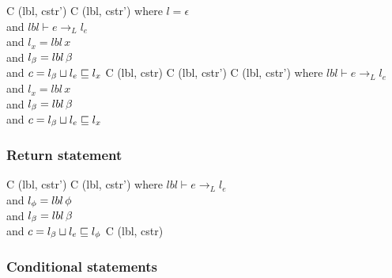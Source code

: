 \begin{trules}
        { {C} {(lbl, cstr')} }
        { {C} {(lbl, cstr')} }
        {where $l = \epsilon$\\
          and $lbl \vdash e \rightarrow_L l_e$\\
          and $l_x = lbl \, x$\\
          and $l_\beta = lbl \, \beta$\\
          and $c = l_\beta \sqcup l_e \sqsubseteq l_x$}
        { {C} {(lbl, cstr)}}
        {}
        { {C} {(lbl, cstr')}}
        { {C} {(lbl, cstr')}}
        {where $lbl \vdash e \rightarrow_L l_e$\\
          and $l_x = lbl \, x$\\
          and $l_\beta = lbl \, \beta$\\
          and $c = l_\beta \sqcup l_e \sqsubseteq l_x$}
\end{trules}

\subsubsection{Return statement}

\begin{trules}
        { {C} {(lbl, cstr')} }
        { {C} {(lbl, cstr')} }
        {where $lbl \vdash e \rightarrow_L l_e$\\
          and $l_\phi = lbl \, \phi$\\
          and $l_\beta = lbl \, \beta$\\
          and $c = l_\beta \sqcup l_e \sqsubseteq l_\phi$}
        { {C} {(lbl, cstr)} }
        {}
        {}
        {}
\end{trules}

\subsubsection{Conditional statements}


